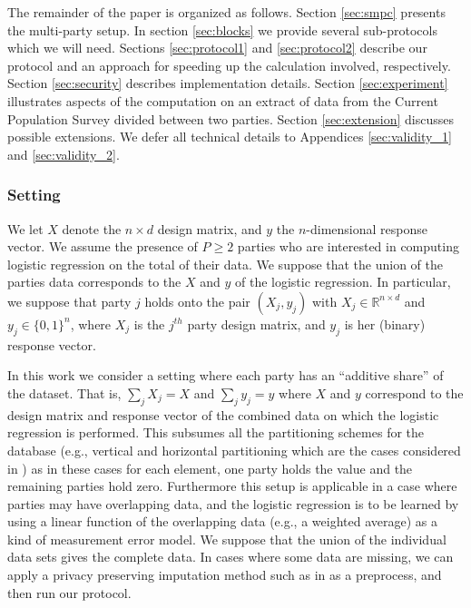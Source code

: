 \documentclass[11pt]{article}
\begin{document}
The remainder of the paper is organized as follows. Section \ref{sec:smpc} presents the multi-party setup.  In section \ref{sec:blocks} we provide several sub-protocols which we will need. Sections \ref{sec:protocol1} and \ref{sec:protocol2} describe our protocol and an approach for speeding up the calculation involved, respectively. Section \ref{sec:security} describes implementation details. Section \ref{sec:experiment}  illustrates aspects of the computation on an extract of data from the Current Population Survey divided between two parties. Section  \ref{sec:extension} discusses possible extensions.  We defer all technical details  to Appendices \ref{sec:validity_1} and \ref{sec:validity_2}. 




\subsubsection*{Setting}

We let $X$ denote the $n\times d$ design matrix, and $y$ the $n$-dimensional response vector. We assume the presence of $P \geq 2$ parties who are interested in computing logistic regression on the total of their data.  We suppose that the union of the parties data corresponds to the $X$ and $y$ of the logistic regression.  In particular, we suppose that party $j$ holds onto the pair $(X_j, y_j)$ with $X_j \in \mathbb{R}^{n\times d}$ and $y_j \in \{0,1\}^n$, where $X_j$ is the $j^{th}$ party design matrix, and $y_j$ is her (binary) response vector.

In this work we consider a setting where each party has an ``additive share'' of the dataset.  That is, $\sum_j X_j = X$ and $\sum_j y_j=y$ where $X$ and $y$ correspond to the design matrix and response vector of the combined data on which the logistic regression is performed.  This subsumes all the partitioning schemes for the database (e.g., vertical and horizontal partitioning which are the cases considered in \cite{ppdm_book}) as in these cases for each element, one party holds the value and the remaining parties hold zero.  Furthermore this setup is applicable in a case where parties may have overlapping data, and the logistic regression is to be learned by using a linear function of the overlapping data (e.g., a weighted average) as a kind of measurement error model.  We suppose that the union of the individual data sets gives the complete data.  In cases where some data are missing, we can apply a privacy preserving imputation method such as in \citet{jagannathan}  as a preprocess, and then run our protocol.
\end{document}
